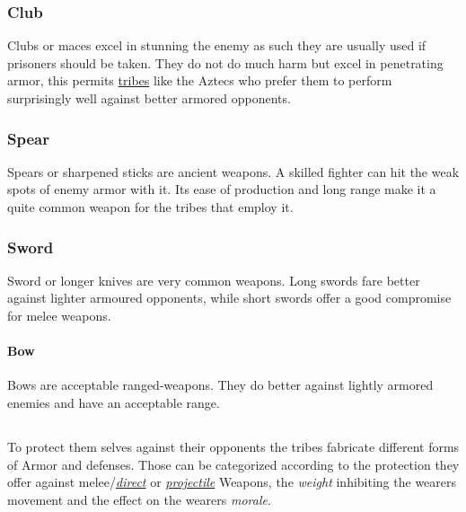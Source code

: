 \subsubsection{Club}\label{ch:Goods:Armory:Weapons:Club}

Clubs or maces excel in stunning the enemy as such they are usually used if
prisoners should be taken. They do not do much harm but excel in penetrating
armor, this permits \hyperref[ch:Tribes]{tribes} like the \gls{Aztecs} who
prefer them to perform surprisingly well against better armored opponents.

\subsubsection{Spear}\label{ch:Goods:Armory:Weapons:Spear}

Spears or sharpened sticks are ancient weapons. A skilled fighter can hit the
weak spots of enemy armor with it. Its ease of production and long range make
it a quite common weapon for the tribes that employ it.

\subsubsection{Sword}\label{ch:Goods:Armory:Weapons:Sword}

Sword or longer knives are very common weapons. Long swords fare better against
lighter armoured opponents, while short swords offer a good compromise for
melee weapons.

\paragraph{Bow}

Bows are acceptable ranged-weapons. They do better against lightly armored
enemies and have an acceptable range.

\subsection{}\label{ch:Goods:Armory:Armor}

To protect them selves against their opponents the tribes fabricate different
forms of \gls*{Armor} and defenses. Those can be categorized according to the
protection they offer against melee/\hyperref[ch:Conflict]{\emph{direct}} or
\hyperref[ch:Conflict]{\emph{projectile}} \glspl{Weapon}, the \emph{weight}
inhibiting the wearers movement and the effect on the wearers \emph{morale}.

